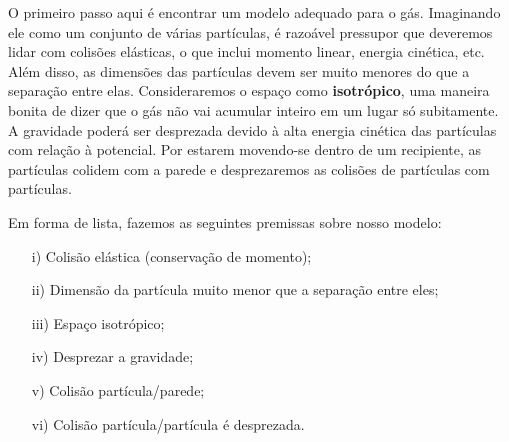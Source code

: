 \documentclass{article}
\begin{document}
O primeiro passo aqui é encontrar um modelo adequado para o gás. Imaginando ele como um conjunto
de várias partículas, é razoável pressupor que deveremos lidar com colisões elásticas, o que inclui momento
linear, energia cinética, etc. Além disso, as dimensões das partículas devem ser muito menores do que a separação entre elas.
Consideraremos o espaço como \textbf{isotrópico}, uma maneira bonita de dizer que o gás não vai acumular inteiro em um
lugar só subitamente. A gravidade poderá ser desprezada devido à alta energia cinética das partículas com relação à potencial.
Por estarem movendo-se dentro de um recipiente, as partículas colidem com a parede e desprezaremos as colisões de partículas com partículas.


Em forma de lista, fazemos as seguintes premissas sobre nosso modelo:
\begin{itemize}
  \item[i)] Colisão elástica (conservação de momento);
  \item[ii)] Dimensão da partícula muito menor que a separação entre eles;
  \item[iii)] Espaço isotrópico;
  \item[iv)] Desprezar a gravidade;
  \item[v)] Colisão partícula/parede;
  \item[vi)] Colisão partícula/partícula é desprezada.
\end{itemize}
\end{document}
